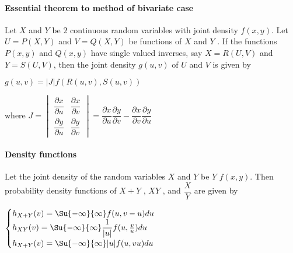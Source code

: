 \paragraph{Essential theorem to method of bivariate case}
Let $X$ and $Y$ be $2$ continuous random variables with joint density $f(x, y)$. Let $U=P(X,Y)$ and $V = Q(X,Y)$ be functions of $X$
and $Y$ . If the functions $P(x,y)$ and $Q(x,y)$ have single valued inverses, say
$X=R(U,V)$ and $Y=S(U,V)$, then the joint density $g(u,v)$ of $U$ and $V$ is given by
\begin{center}
	$g(u,v)=|J|f\left(R(u,v),S(u,v)\right)$
\end{center}
where $J=
\begin{vmatrix}
	\dfrac{\partial x}{\partial u} & \dfrac{\partial x}{\partial v}\\
	\dfrac{\partial y}{\partial u} & \dfrac{\partial y}{\partial v}
\end{vmatrix}
=\dfrac{\partial x}{\partial u}\dfrac{\partial y}{\partial v}-\dfrac{\partial x}{\partial v}\dfrac{\partial y}{\partial u}$
\paragraph{Density functions}
Let the joint density of the random variables $X$ and $Y$ be $Y$
$f(x, y)$. Then probability density functions of $X + Y$ , $XY$ , and $\dfrac{X}{Y}$ are given by
\begin{center}
$\begin{cases} 
	h_{X+Y}(v) = \Su{ {-\infty}}{\infty}f(u,v-u)du\\
	h_{XY}(v) = \Su{ {-\infty}}{\infty}\dfrac{1}{|u|}f(u,\frac{v}{u})du\\
	h_{X+Y}(v) = \Su{ {-\infty}}{\infty}|u|f(u,vu)du
\end{cases}$
\end{center}

